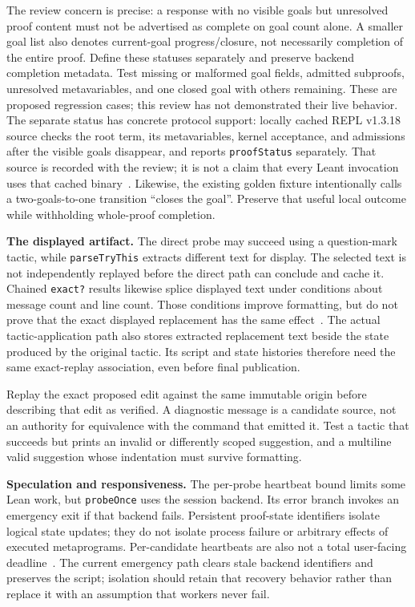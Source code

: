 \documentclass[11pt,letterpaper]{article}
\newcommand{\code}[1]{\nolinkurl{#1}}
\begin{document}
The review concern is precise: a response with no visible goals but unresolved
proof content must not be advertised as complete on goal count alone. A smaller
goal list also denotes current-goal progress/closure, not necessarily completion
of the entire proof. Define these statuses separately and preserve backend
completion metadata. Test missing or malformed goal fields, admitted subproofs,
unresolved metavariables, and one closed goal with others remaining. These are
proposed regression cases; this review has not demonstrated their live behavior.
The separate status has concrete protocol support: locally cached REPL v1.3.18
source checks the root term, its metavariables, kernel acceptance, and admissions
after the visible goals disappear, and reports \code{proofStatus} separately.
That source is recorded with the review; it is not a claim that every Leant
invocation uses that cached binary~\cite{l-protocol}. Likewise, the existing golden
fixture intentionally calls a two-goals-to-one transition ``closes the goal''.
Preserve that useful local outcome while withholding whole-proof completion.

\textbf{The displayed artifact.} The direct probe may succeed using a question-mark
tactic, while \code{parseTryThis} extracts different text for display. The selected
text is not independently replayed before the direct path can conclude and cache
it. Chained \code{exact?} results likewise splice displayed text under conditions
about message count and line count. Those conditions improve formatting, but do
not prove that the exact displayed replacement has the same effect~\cite{l-main}.
The actual tactic-application path also stores extracted replacement text beside
the state produced by the original tactic. Its script and state histories therefore
need the same exact-replay association, even before final publication.

Replay the exact proposed edit against the same immutable origin before describing
that edit as verified. A diagnostic message is a candidate source, not an authority
for equivalence with the command that emitted it. Test a tactic that succeeds but
prints an invalid or differently scoped suggestion, and a multiline valid suggestion
whose indentation must survive formatting.

\textbf{Speculation and responsiveness.} The per-probe heartbeat bound limits some
Lean work, but \code{probeOnce} uses the session backend. Its error branch invokes
an emergency exit if that backend fails. Persistent proof-state identifiers isolate
logical state updates; they do not isolate process failure or arbitrary effects of
executed metaprograms. Per-candidate heartbeats are also not a total user-facing
deadline~\cite{l-main,l-backend}.
The current emergency path clears stale backend identifiers and preserves the
script; isolation should retain that recovery behavior rather than replace it
with an assumption that workers never fail.
\end{document}
